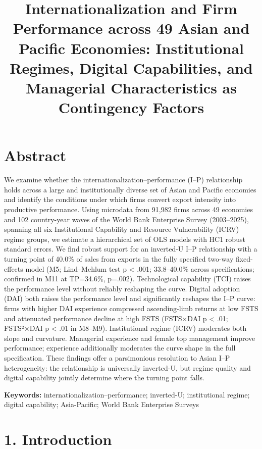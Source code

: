 \documentclass[
  12pt]{article}
\title{Internationalization and Firm Performance across 49 Asian and
Pacific Economies: Institutional Regimes, Digital Capabilities, and
Managerial Characteristics as Contingency Factors}
\author{}
\date{}
\begin{document}
\maketitle

\hypertarget{abstract}{%
\section{Abstract}\label{abstract}}

We examine whether the internationalization--performance (I--P)
relationship holds across a large and institutionally diverse set of
Asian and Pacific economies and identify the conditions under which
firms convert export intensity into productive performance. Using
microdata from 91,982 firms across 49 economies and 102 country-year
waves of the World Bank Enterprise Survey (2003--2025), spanning all six
Institutional Capability and Resource Vulnerability (ICRV) regime
groups, we estimate a hierarchical set of OLS models with HC1 robust
standard errors. We find robust support for an inverted-U I--P
relationship with a turning point of 40.0\% of sales from exports in the
fully specified two-way fixed-effects model (M5; Lind--Mehlum test p
\textless{} .001; 33.8--40.0\% across specifications; confirmed in M11
at TP=34.6\%, p=.002). Technological capability (TCI) raises the
performance level without reliably reshaping the curve. Digital adoption
(DAI) both raises the performance level and significantly reshapes the
I--P curve: firms with higher DAI experience compressed ascending-limb
returns at low FSTS and attenuated performance decline at high FSTS
(FSTS×DAI p \textless{} .01; FSTS²×DAI p \textless{} .01 in M8--M9).
Institutional regime (ICRV) moderates both slope and curvature.
Managerial experience and female top management improve performance;
experience additionally moderates the curve shape in the full
specification. These findings offer a parsimonious resolution to Asian
I--P heterogeneity: the relationship is universally inverted-U, but
regime quality and digital capability jointly determine where the
turning point falls.

\textbf{Keywords:} internationalization--performance; inverted-U;
institutional regime; digital capability; Asia-Pacific; World Bank
Enterprise Surveys

\hypertarget{introduction}{%
\section{1. Introduction}\label{introduction}}
\end{document}
